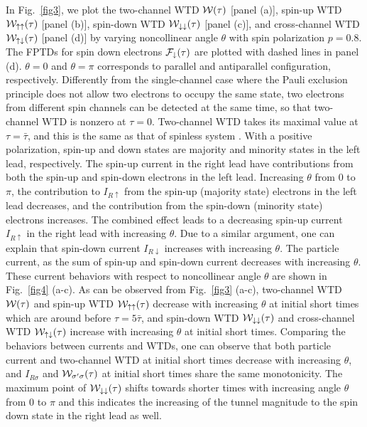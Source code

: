 \documentclass[aps,prb,twocolumn,footinbib,showpacs,superscriptaddress,preprintnumbers,amsmath,amssymb]{revtex4-1}
\begin{document}
	In Fig.~\ref{fig3}, we plot the two-channel WTD ${\cal W}(\tau)$ [panel (a)], spin-up WTD ${\cal W}_{\uparrow\uparrow}(\tau)$ [panel (b)], spin-down WTD ${\cal W}_{\downarrow\downarrow}(\tau)$ [panel (c)], and cross-channel WTD ${\cal W}_{\uparrow\downarrow}(\tau)$ [panel (d)] by varying noncollinear angle $\theta$ with spin polarization $p=0.8$. The FPTDs for spin down electrons ${\cal F}_{\downarrow}(\tau)$ are plotted with dashed lines in panel (d). $\theta=0$ and $\theta=\pi$ corresponds to parallel and antiparallel configuration, respectively. Differently from the single-channel case where the Pauli exclusion principle does not allow two electrons to occupy the same state, two electrons from different spin channels can be detected at the same time, so that two-channel WTD is nonzero at $\tau=0$. Two-channel WTD takes its maximal value at $\tau=\bar{\tau}$, and this is the same as that of spinless system \cite{WTD2012}. 
	With a positive polarization, spin-up and down states are majority and minority states in the left lead, respectively. The spin-up current in the right lead have contributions from both the spin-up and spin-down electrons in the left lead. Increasing $\theta$ from $0$ to $\pi$, the contribution to $I_{R\uparrow}$ from the spin-up (majority state) electrons in the left lead decreases, and the contribution from the spin-down (minority state) electrons increases. The combined effect leads to a decreasing spin-up current $I_{R\uparrow}$ in the right lead with increasing $\theta$. Due to a similar argument, one can explain that spin-down current $I_{R\downarrow}$ increases with increasing $\theta$. The particle current, as the sum of spin-up and spin-down current decreases with increasing $\theta$. These current behaviors with respect to noncollinear angle $\theta$ are shown in Fig.~\ref{fig4} (a-c). As can be observed from Fig.~\ref{fig3} (a-c), two-channel WTD ${\cal W}(\tau)$ and spin-up WTD ${\cal W}_{\uparrow\uparrow}(\tau)$ decrease with increasing $\theta$ at initial short times which are around before $\tau=5\bar{\tau}$, and spin-down WTD ${\cal W}_{\downarrow\downarrow}(\tau)$ and cross-channel WTD ${\cal W}_{\uparrow\downarrow}(\tau)$ increase with increasing $\theta$ at initial short times. Comparing the behaviors between currents and WTDs, one can observe that both particle current and two-channel WTD at initial short times decrease with increasing $\theta$, and $I_{R\sigma}$ and ${\cal W}_{\sigma'\sigma}(\tau)$ at initial short times share the same monotonicity.
	 The maximum point of ${\cal W}_{\downarrow\downarrow}(\tau)$ shifts towards shorter times with increasing angle $\theta$ from $0$ to $\pi$ and this indicates the increasing of the tunnel magnitude to the spin down state in the right lead as well.
	
\end{document}
